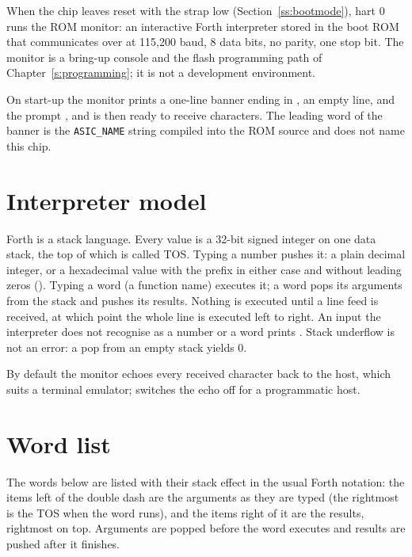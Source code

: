 \documentclass[11pt,pdftex,openany,letterpaper]{report}
\begin{document}
When the chip leaves reset with the  strap low (Section~\ref{ss:bootmode}), hart 0 runs the ROM monitor: an interactive Forth interpreter stored in the boot ROM that communicates over  at 115,200 baud, 8 data bits, no parity, one stop bit. The monitor is a bring-up console and the flash programming path of Chapter~\ref{s:programming}; it is not a development environment.

On start-up the monitor prints a one-line banner ending in , an empty line, and the prompt \forthinline{>}, and is then ready to receive characters. The leading word of the banner is the \texttt{ASIC\_NAME} string compiled into the ROM source and does not name this chip.

\section{Interpreter model}

Forth is a stack language. Every value is a 32-bit signed integer on one data stack, the top of which is called TOS. Typing a number pushes it: a plain decimal integer, or a hexadecimal value with the prefix  in either case and without leading zeros (). Typing a word (a function name) executes it; a word pops its arguments from the stack and pushes its results. Nothing is executed until a line feed is received, at which point the whole line is executed left to right. An input the interpreter does not recognise as a number or a word prints . Stack underflow is not an error: a pop from an empty stack yields 0.

By default the monitor echoes every received character back to the host, which suits a terminal emulator;  switches the echo off for a programmatic host.

\section{Word list}

The words below are listed with their stack effect in the usual Forth notation: the items left of the double dash are the arguments as they are typed (the rightmost is the TOS when the word runs), and the items right of it are the results, rightmost on top. Arguments are popped before the word executes and results are pushed after it finishes.
\end{document}
